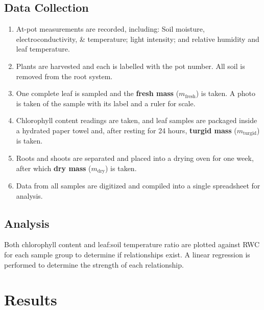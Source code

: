 \documentclass{report}
\begin{document}
\subsection{Data Collection}

\begin{enumerate}
    \item At-pot measurements are recorded, including: Soil moisture, electroconductivity, \& temperature; light intensity; and relative humidity and leaf temperature.
    \item Plants are harvested and each is labelled with the pot number. All soil is removed from the root system.
    \item One complete leaf is sampled and the \textbf{fresh mass} ($m_{\text{fresh}}$) is taken. A photo is taken of the sample with its label and a ruler for scale.
    \item Chlorophyll content readings are taken, and leaf samples are packaged inside a hydrated paper towel and, after resting for 24 hours, \textbf{turgid mass} ($m_{\text{turgid}}$) is taken.
    \item Roots and shoots are separated and placed into a drying oven for one week, after which \textbf{dry mass} ($m_{\text{dry}}$) is taken.
    \item Data from all samples are digitized and compiled into a single spreadsheet for analysis.
\end{enumerate}

\subsection{Analysis}

\hspace{24pt}Both chlorophyll content and leaf:soil temperature ratio are plotted against RWC for each sample group to determine if relationships exist. A linear regression is performed to determine the strength of each relationship.

\clearpage

\section{Results}

\end{document}
